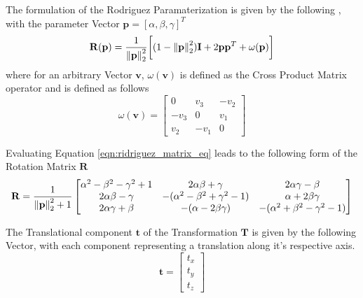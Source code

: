 The formulation of the Rodriguez Paramaterization is given by the following 
\cite{Shuster1993}, with the parameter Vector
$\mathbf{p} = [\alpha, \beta, \gamma]^{T}$
\begin{equation}
  \label{eqn:rodriguez_matrix_eq}
  \mathbf{R}(\mathbf{p}) =
  \frac{1}{\left\lVert\mathbf{p}\right\rVert_{2}^{2}}
  \bigg[
  (1 - \left\lVert\mathbf{p}\right\rVert_{2}^{2})\mathbf{I} +
  2 \mathbf{pp}^{T} + \omega(\mathbf{p})
  \bigg]
\end{equation}
where for an arbitrary Vector $\mathbf{v}$, $\omega(\mathbf{v})$ is defined as
the Cross Product Matrix operator and is defined as follows
\begin{equation}
  \label{eqn:cross_prod_mat}
  \omega(\mathbf{v}) =
  \begin{bmatrix}
    0 & v_{3} & -v_{2} \\
    -v_{3} & 0 & v_{1} \\
    v_{2} & -v_{1} & 0
  \end{bmatrix}
\end{equation}

Evaluating Equation \ref{eqn:ridriguez_matrix_eq} leads to the following form
of the Rotation Matrix $\mathbf{R}$
\begin{equation}
  \label{eqn:rodriguez_matrix}
  \mathbf{R} = \frac{1}{\left\lVert\mathbf{p}\right\rVert_{2}^{2} + 1}
  \begin{bmatrix}
    \alpha^{2} - \beta^{2} - \gamma^{2} + 1 &
    2 \alpha \beta + \gamma &
    2 \alpha \gamma - \beta \\
    2 \alpha \beta - \gamma &
    -(\alpha^{2} - \beta^{2} + \gamma^{2} - 1) &
    \alpha + 2 \beta \gamma \\
    2 \alpha \gamma + \beta &
    -(\alpha - 2 \beta \gamma) &
    -(\alpha^{2} + \beta^{2} - \gamma^{2} - 1)
  \end{bmatrix}
\end{equation}

The Translational component $\mathbf{t}$ of the Transformation $\mathbf{T}$ is
given by the following Vector, with each component representing a translation
along it's respective axis.
\begin{equation}
  \label{eqn:trans_vector}
  \mathbf{t} =
  \begin{bmatrix}
    t_{x} \\
    t_{y} \\
    t_{z}
  \end{bmatrix}
\end{equation}

